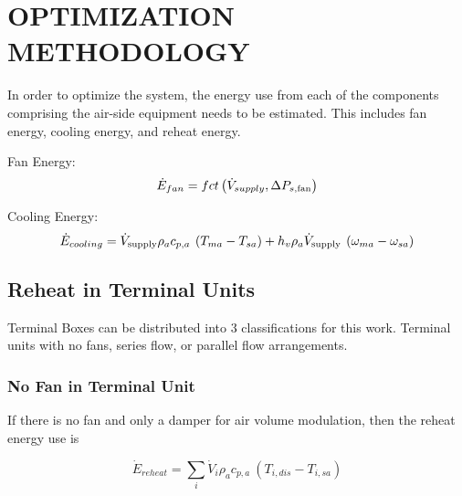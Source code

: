 %
%
%



\chapter{\uppercase{Optimization Methodology}}

In order to optimize the system, the energy use from each of the components comprising the air-side equipment needs to be estimated. This includes fan energy, cooling energy, and reheat energy.


Fan Energy:
\begin{equation} \label{eq:FanEqnergy} 
\dot E_{fan} = fct\left( {\dot{V}_{supply},\Delta {P_{s,{\rm{fan}}}}} \right)
\end{equation}

Cooling Energy:
\begin{equation} \label{eq:CoolingEnergy}
{\dot E_{cooling}} = {\dot V_{{\rm{supply}}}}\rho_a c_{p,a}\:\left( {{T_{ma}} - {T_{sa}}} \right) + h_v\rho_a{\dot V_{{\rm{supply}}}}\:\left( {{\omega _{ma}} - {\omega _{sa}}} \right)
\end{equation}

\section{Reheat in Terminal Units}

Terminal Boxes can be distributed into 3 classifications for this work. Terminal units with no fans, series flow, or parallel flow arrangements.

\subsection{No Fan in Terminal Unit}

If there is no fan and only a damper for air volume modulation, then the reheat energy use is 

\begin{equation} \label{eq:ReheatEnergy}
{\dot E_{reheat}} = \sum\limits_i {{{\dot V}_i}\rho_a c_{p,a}\:\left( {{T_{i,dis}} - {T_{i,sa}}} \right)} 
\end{equation}

